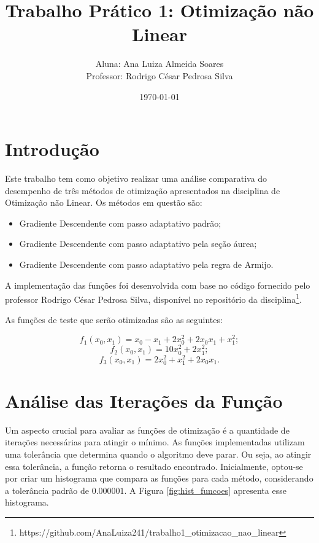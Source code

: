 \documentclass{article}
\title{Trabalho Prático 1: Otimização não Linear}
\author{Aluna: Ana Luiza Almeida Soares
\\Professor: Rodrigo César Pedrosa Silva}
\date{\today}
\begin{document}
\maketitle

\section{Introdução}

Este trabalho tem como objetivo realizar uma análise comparativa do desempenho de três métodos de otimização apresentados na disciplina de Otimização não Linear. Os métodos em questão são:

\begin{itemize}
  \item Gradiente Descendente com passo adaptativo padrão;
  \item Gradiente Descendente com passo adaptativo pela seção áurea;
  \item Gradiente Descendente com passo adaptativo pela regra de Armijo. 
\end{itemize}

A implementação das funções foi desenvolvida com base no código fornecido pelo professor Rodrigo César Pedrosa Silva, disponível no repositório da disciplina\footnote{https://github.com/AnaLuiza241/trabalho1\_otimizacao\_nao\_linear}.

As funções de teste que serão otimizadas são as seguintes:

\begin{equation}
  f_1(x_0, x_1) = x_0 - x_1 + 2x_0^2 + 2x_0x_1 + x_1^2;
\end{equation}
\begin{equation}
  f_2(x_0, x_1) = 10x_0^2 + 2x_1^2;
\end{equation}
\begin{equation}
  f_3(x_0, x_1) = 2x_0^2 + x_1^2 + 2x_0x_1.
\end{equation}

\section{Análise das Iterações da Função}

Um aspecto crucial para avaliar as funções de otimização é a quantidade de iterações necessárias para atingir o mínimo. As funções implementadas utilizam uma tolerância que determina quando o algoritmo deve parar. Ou seja, ao atingir essa tolerância, a função retorna o resultado encontrado. Inicialmente, optou-se por criar um histograma que compara as funções para cada método, considerando a tolerância padrão de $0.000001$. A Figura \ref{fig:hist_funcoes} apresenta esse histograma.
\end{document}

